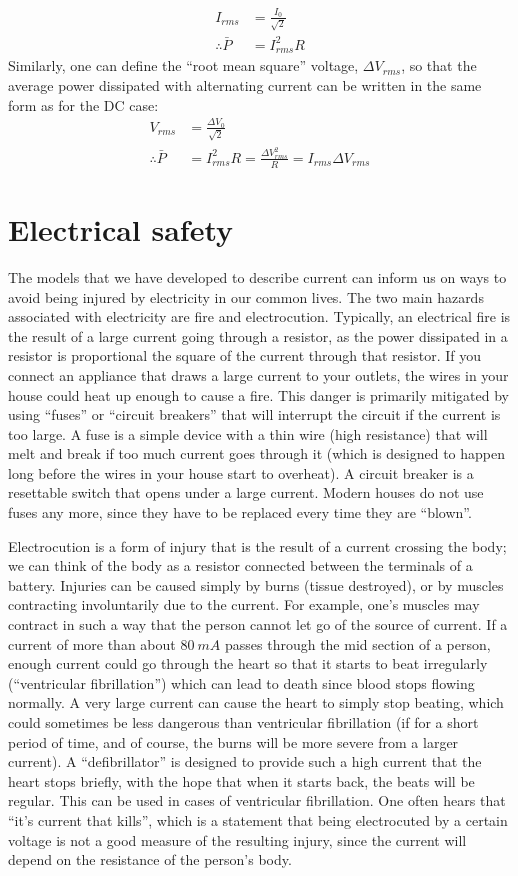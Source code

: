 \begin{align*}
I_{rms}&=\frac{I_0}{\sqrt 2}\\
\therefore\bar P&=I_{rms}^2R
\end{align*}
Similarly, one can define the ``root mean square'' voltage, $\Delta V_{rms}$, so that the average power dissipated with alternating current can be written in the same form as for the DC case:
\begin{align*}
V_{rms}&=\frac{\Delta V_0}{\sqrt 2}\\
\therefore\bar P&=I_{rms}^2R =\frac{\Delta V_{rms}^2}{R}=I_{rms}\Delta V_{rms}
\end{align*}

\section{Electrical safety}
The models that we have developed to describe current can inform us on ways to avoid being injured by electricity in our common lives. The two main hazards associated with electricity are fire and electrocution. Typically, an electrical fire is the result of a large current going through a resistor, as the power dissipated in a resistor is proportional the square of the current through that resistor. If you connect an appliance that draws a large current to your outlets, the wires in your house could heat up enough to cause a fire. This danger is primarily mitigated by using ``fuses'' or ``circuit breakers'' that will interrupt the circuit if the current is too large. A fuse is a simple device with a thin wire (high resistance) that will melt and break if too much current goes through it (which is designed to happen long before the wires in your house start to overheat). A circuit breaker is a resettable switch that opens under a large current. Modern houses do not use fuses any more, since they have to be replaced every time they are ``blown''.

Electrocution is a form of injury that is the result of a current crossing the body; we can think of the body as a resistor connected between the terminals of a battery. Injuries can be caused simply by burns (tissue destroyed), or by muscles contracting involuntarily due to the current. For example, one's muscles may contract in such a way that the person cannot let go of the source of current. If a current of more than about $\SI{80}{mA}$ passes through the mid section of a person, enough current could go through the heart so that it starts to beat irregularly (``ventricular fibrillation'') which can lead to death since blood stops flowing normally. A very large current can cause the heart to simply stop beating, which could sometimes be less dangerous than ventricular fibrillation (if for a short period of time, and of course, the burns will be more severe from a larger current). A ``defibrillator'' is designed to provide such a high current that the heart stops briefly, with the hope that when it starts back, the beats will be regular. This can be used in cases of ventricular fibrillation. One often hears that ``it's current that kills'', which is a statement that being electrocuted by a certain voltage is not a good measure of the resulting injury, since the current will depend on the resistance of the person's body.

